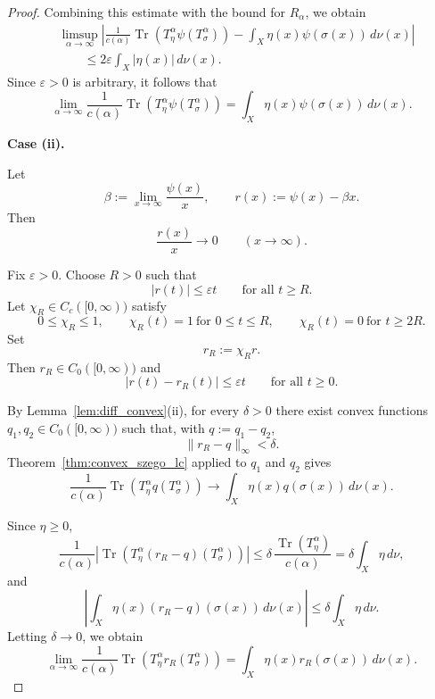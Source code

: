 \documentclass{amsart}
\theoremstyle{definition}
\theoremstyle{remark}
\numberwithin{equation}{section}
\begin{document}
\begin{proof}
Combining this estimate with the bound for $R_\alpha$, we obtain
\[
\begin{aligned}
&\limsup_{\alpha\to\infty}
\left|
\frac{1}{c(\alpha)}
\operatorname{Tr}\!\left(
T_\eta^\alpha\psi(T_\sigma^\alpha)
\right)
-
\int_X\eta(x)\psi(\sigma(x))\,d\nu(x)
\right|
\\
&\qquad\leq
2\varepsilon\int_X|\eta(x)|\,d\nu(x).
\end{aligned}
\]
Since $\varepsilon>0$ is arbitrary, it follows that
\[
\lim_{\alpha\to\infty}
\frac{1}{c(\alpha)}
\operatorname{Tr}\!\left(
T_\eta^\alpha\psi(T_\sigma^\alpha)
\right)
=
\int_X\eta(x)\psi(\sigma(x))\,d\nu(x).
\]


\medskip
\noindent
\textbf{Case (ii).}

Let
\[
\beta:=\lim_{x\to\infty}\frac{\psi(x)}{x},
\qquad
r(x):=\psi(x)-\beta x.
\]
Then
\[
\frac{r(x)}{x}\longrightarrow0
\qquad (x\to\infty).
\]

Fix $\varepsilon>0$. Choose $R>0$ such that
\[
|r(t)|\leq\varepsilon t
\qquad\text{for all }t\geq R.
\]
Let $\chi_R\in C_c([0,\infty))$ satisfy
\[
0\leq\chi_R\leq1,\qquad
\chi_R(t)=1\ \text{for }0\leq t\leq R,\qquad
\chi_R(t)=0\ \text{for }t\geq2R.
\]
Set
\[
r_R:=\chi_R r.
\]
Then $r_R\in C_0([0,\infty))$ and
\[
|r(t)-r_R(t)|\leq\varepsilon t
\qquad\text{for all }t\geq0.
\]

By Lemma~\ref{lem:diff_convex}(ii), for every $\delta>0$ there exist convex functions
$q_1,q_2\in C_0([0,\infty))$ such that, with
$q:=q_1-q_2$,
\[
\|r_R-q\|_\infty<\delta.
\]
Theorem~\ref{thm:convex_szego_lc} applied to $q_1$ and $q_2$ gives
\[
\frac{1}{c(\alpha)}
\operatorname{Tr}\!\left(
T_\eta^\alpha q(T_\sigma^\alpha)
\right)
\longrightarrow
\int_X\eta(x)q(\sigma(x))\,d\nu(x).
\]

Since $\eta\geq0$,
\[
\frac{1}{c(\alpha)}
\left|
\operatorname{Tr}\!\left(
T_\eta^\alpha(r_R-q)(T_\sigma^\alpha)
\right)
\right|
\leq
\delta\,
\frac{\operatorname{Tr}(T_\eta^\alpha)}{c(\alpha)}
=
\delta\int_X\eta\,d\nu,
\]
and
\[
\left|
\int_X\eta(x)(r_R-q)(\sigma(x))\,d\nu(x)
\right|
\leq
\delta\int_X\eta\,d\nu.
\]
Letting $\delta\to0$, we obtain
\[
\lim_{\alpha\to\infty}
\frac{1}{c(\alpha)}
\operatorname{Tr}\!\left(
T_\eta^\alpha r_R(T_\sigma^\alpha)
\right)
=
\int_X\eta(x)r_R(\sigma(x))\,d\nu(x).
\]


\end{proof}
\end{document}
